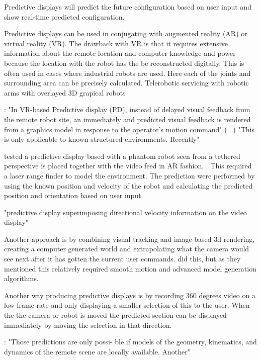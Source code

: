 Predictive displays will predict the future configuration based on user input and show real-time predicted configuration.

Predictive displays can be used in conjugating with augmented reality (AR) or virtual reality (VR). The drawback with VR is that it requires extensive information about the remote location and computer knowledge and power because the location with the robot has the be reconstructed digitally. This is often used in cases where industrial robots are used. Here each of the joints and surrounding area can be precisely calculated. Telerobotic servicing with robotic arms with overlayed 3D grapical robots \citep{Kim1993}

\citep{Hu2016}: "In VR-based Predictive display (PD), instead of delayed visual feedback from the remote robot site, an immediately and predicted visual feedback is rendered from a graphics model in response to the operator's motion command" (...) "This is only applicable to known structured environments. Recently"

\citep{Ricks2004} tested a predictive display based with a phantom robot seen from a tethered perspective is placed together with the video feed in AR fashion, . This required a laser range finder to model the environment. The prediction were performed by using the known position and velocity of the robot and calculating the predicted position and orientation based on user input.

\citep{Mathan1996} "predictive display superimposing directional
velocity information on the video display"

Another approach is by combining visual tracking and image-based 3d rendering, creating a computer generated world and extrapolating what the camera would see next after it has gotten the current user commands. \citep{Hu2015} did this, but as they mentioned this relatively required smooth motion and advanced model generation algorithms.

Another way producing predictive displays is by recording 360 degrees video on a low frame rate and only displaying a smaller selection of this to the user. When the the camera or robot is moved the predicted section can be displayed immediately by moving the selection in that direction. \citep{Baldwin1999}

\citep{Burkert2004}: "Those predictions are only possi- ble if models of the geometry, kinematics, and dynamics of the remote scene are locally available. Another"

